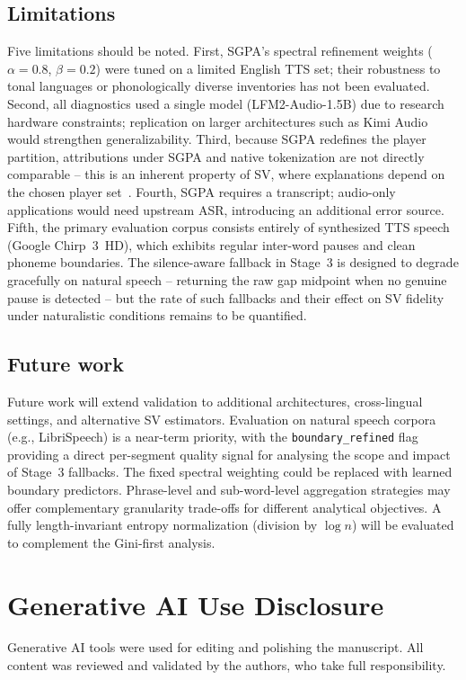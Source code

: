 \documentclass[cameraready]{Interspeech}
\begin{document}
\subsection{Limitations} Five limitations should be noted. First, SGPA's spectral refinement weights ($\alpha{=}0.8$, $\beta{=}0.2$) were tuned on a limited English TTS set; their robustness to tonal languages or phonologically diverse inventories has not been evaluated. Second, all diagnostics used a single model (LFM2-Audio-1.5B) due to research hardware constraints; replication on larger architectures such as Kimi Audio~\cite{KimiTeam_2025} would strengthen generalizability. Third, because SGPA redefines the player partition, attributions under SGPA and native tokenization are not directly comparable -- this is an inherent property of SV, where explanations depend on the chosen player set~\cite{RM-670-PR}. Fourth, SGPA requires a transcript; audio-only applications would need upstream ASR, introducing an additional error source. Fifth, the primary evaluation corpus consists entirely of synthesized TTS speech (Google Chirp~3~HD), which exhibits regular inter-word pauses and clean phoneme boundaries. The silence-aware fallback in Stage~3 is designed to degrade gracefully on natural speech -- returning the raw gap midpoint when no genuine pause is detected -- but the rate of such fallbacks and their effect on SV fidelity under naturalistic conditions remains to be quantified.

\subsection{Future work} Future work will extend validation to additional architectures, cross-lingual settings, and alternative SV estimators. Evaluation on natural speech corpora (e.g., LibriSpeech) is a near-term priority, with the \texttt{boundary\_refined} flag providing a direct per-segment quality signal for analysing the scope and impact of Stage~3 fallbacks. The fixed spectral weighting could be replaced with learned boundary predictors. Phrase-level and sub-word-level aggregation strategies may offer complementary granularity trade-offs for different analytical objectives. A fully length-invariant entropy normalization (division by $\log n$) will be evaluated to complement the Gini-first analysis.

\section{Generative AI Use Disclosure}
Generative AI tools were used for editing and polishing the manuscript. All content was reviewed and validated by the authors, who take full responsibility.
\end{document}
